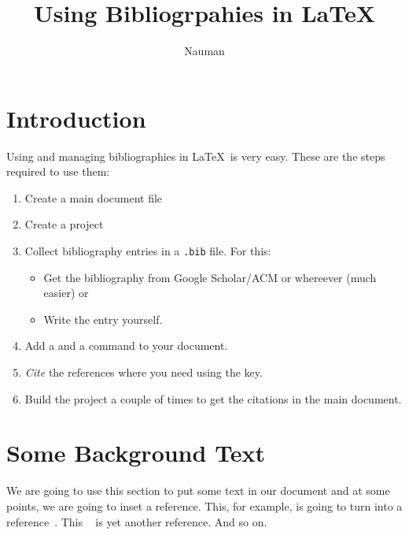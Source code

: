 \documentclass{article}
\begin{document}
\title{Using Bibliogrpahies in \LaTeX}
\author{Nauman}
\maketitle


\section{Introduction} 
Using and managing bibliographies in \LaTeX\ is very easy. These are the steps required to use them: 

\begin{enumerate}
	\item Create a main document file 
	\item Create a project
	\item Collect bibliography entries in a \verb|.bib| file. For this: 
	   \begin{itemize}
	     \item Get the bibliography from Google Scholar/ACM or whereever (much easier) or 
	     \item Write the entry yourself. 
     \end{itemize}
	\item Add a \verb|| and a \verb|| command to your document. 
	\item \emph{Cite} the references where you need using the key. 
	\item Build the project a couple of times to get the citations in the main document. 
\end{enumerate}

\section{Some Background Text}
We are going to use this section to put some text in our document and at some points, we are going to inset a reference. This, for example, is going to turn into a reference~\cite{se-cs-collab:nauman10}. This ~\cite{nauman2011using} is yet another reference. And so on.\cite{seo2011user}






\end{document}
